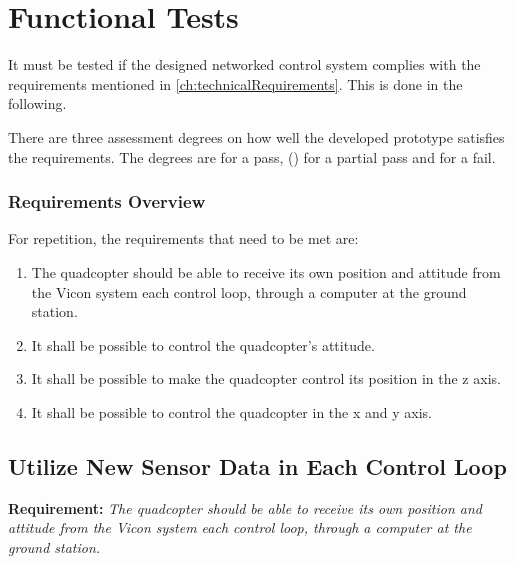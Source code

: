 \chapter{Functional Tests}

It must be tested if the designed networked control system complies with the requirements mentioned in \autoref{ch:technicalRequirements}. This is done in the following. %

There are three assessment degrees on how well the developed prototype satisfies the requirements. The degrees are  for a pass, () for a partial pass and  for a fail. 

\subsection*{Requirements Overview}
For repetition, the requirements that need to be met are:
\begin{enumerate}[label=\textbf{\arabic*})]
\item {The quadcopter should be able to receive its own position and attitude from the Vicon system each control loop, through a computer at the ground station.}
\item {It shall be possible to control the quadcopter's attitude.}
\item {It shall be possible to make the quadcopter control its position in the z axis.}
\item {It shall be possible to control the quadcopter in the x and y axis.}
\end{enumerate}

\section{Utilize New Sensor Data in Each Control Loop}
\textbf{Requirement:}
\textit{The quadcopter should be able to receive its own position and attitude from the Vicon system each control loop, through a computer at the ground station.}


